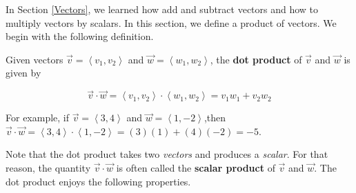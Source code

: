 \documentclass{ximera}
\begin{document}
	\author{Stitz-Zeager}




\setcounter{footnote}{0}

\label{TheDotProduct}

In Section \ref{Vectors}, we learned how add and subtract vectors and how to multiply vectors by scalars.  In this section, we define a product of vectors.  We begin with the following definition.

 
\begin{definition} \label{dotproductdefn}    Given vectors  $\overrightarrow{v} = \left<v_1,v_2\right>$ and $\overrightarrow{w} = \left<w_1,w_2\right>$,  the \textbf{dot product} of $\overrightarrow{v}$ and $\overrightarrow{w}$ is given by

\[ \overrightarrow{v} \cdot \overrightarrow{w} = \left<v_1,v_2\right> \cdot \left<w_1,w_2\right> = v_1w_1 + v_2w_2 \]


 


\end{definition}

 

For example, if $\overrightarrow{v} = \left<3,4\right>$ and $\overrightarrow{w} = \left<1,-2\right>$,then $\overrightarrow{v} \cdot \overrightarrow{w} = \left<3,4\right> \cdot \left<1,-2\right> =  (3)(1) + (4)(-2) = -5$. 

 

Note that the dot product takes two \textit{vectors} and produces a \textit{scalar}.  For that reason, the quantity $\overrightarrow{v} \cdot \overrightarrow{w}$ is often called the \textbf{scalar product} of $\overrightarrow{v}$ and $\overrightarrow{w}$.  The dot product enjoys the following properties.

 

\end{document}
